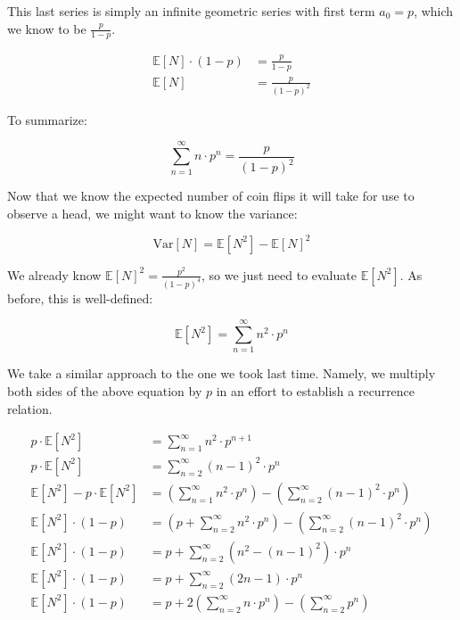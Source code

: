This last series is simply an infinite geometric series with first term $a_{0} = p$, which we know to be $\frac{p}{1-p}$.

\begin{align}
   \mathbb{E}[N] \cdot (1 - p) &= \frac{p}{1-p} \\ 
   \mathbb{E}[N] &= \frac{p}{(1-p)^2} 
\end{align}

To summarize:

\begin{equation}
  \label{eqn:series1}
  \boxed{
    \sum_{n=1}^{\infty} n \cdot p^{n} = \frac{p}{(1-p)^2}
  }
\end{equation}

Now that we know the expected number of coin flips it will take for 
use to observe a head, we might want to know the variance:

\begin{equation}
  \text{Var}[N] = \mathbb{E}[N^2] - \mathbb{E}[N]^2
\end{equation}

We already know $\mathbb{E}[N]^2 = \frac{p^2}{(1-p)^4}$, so we 
just need to evaluate $\mathbb{E}[N^2]$.  As before, this is well-defined:

\begin{equation}
  \mathbb{E}[N^2] = \sum_{n=1}^{\infty} n^2 \cdot p^{n}
\end{equation}

We take a similar approach to the one we took last time.  Namely, we multiply
both sides of the above equation by $p$ in an effort to establish a 
recurrence relation.

\begin{align}
  p \cdot \mathbb{E}[N^2] &= \sum_{n=1}^{\infty} n^2 \cdot p^{n+1} \\
  p \cdot \mathbb{E}[N^2] &= \sum_{n=2}^{\infty} (n-1)^2 \cdot p^{n}  \\
  \mathbb{E}[N^2] - p \cdot \mathbb{E}[N^2] &= \left(\sum_{n=1}^{\infty} n^2 \cdot p^{n}\right) - \left(\sum_{n=2}^{\infty} (n-1)^2 \cdot p^{n}\right) \\ 
  \mathbb{E}[N^2] \cdot (1 - p) &= \left(p + \sum_{n=2}^{\infty} n^2 \cdot p^{n}\right) - \left(\sum_{n=2}^{\infty} (n-1)^2 \cdot p^{n}\right) \\
  \mathbb{E}[N^2] \cdot (1 - p) &= p + \sum_{n=2}^{\infty} \left(n^2 - (n-1)^2\right) \cdot p^{n} \\
  \mathbb{E}[N^2] \cdot (1 - p) &= p + \sum_{n=2}^{\infty} \left(2n - 1\right) \cdot p^{n} \\
  \mathbb{E}[N^2] \cdot (1 - p) &= p + 2\left(\sum_{n=2}^{\infty} n \cdot p^n\right) - \left(\sum_{n=2}^{\infty} p^{n}\right) 
\end{align}

